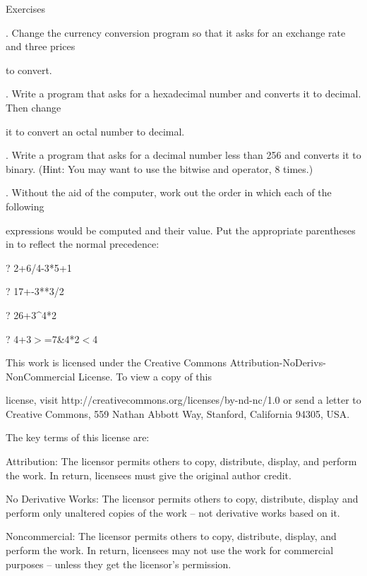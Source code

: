 \documentclass[a4paper,11pt]{book}
\begin{document}
\noindent 

\noindent Exercises

\noindent 

.   Change the currency conversion program so that it asks for an exchange rate and three prices

\noindent to convert.

\noindent 

.   Write a program that asks for a hexadecimal number and converts it to decimal. Then change

\noindent it to convert an octal number to decimal.

\noindent 

.   Write a program that asks for a decimal number less than 256 and converts it to binary. (Hint: You may want to use the bitwise and operator, 8 times.)

\noindent 

.   Without the aid of the computer, work out the order in which each of the following

\noindent expressions would be computed and their value. Put the appropriate parentheses in to reflect the normal precedence:

\noindent 

\noindent 

\noindent ? 2+6/4-3*5+1

\noindent ? 17+-3**3/2

\noindent ? 26+3\^{}4*2

\noindent ? 4+3$>$=7\textbar {}\&4*2$<$4

\noindent  

\noindent  

\noindent  

\noindent  

\noindent 

\noindent 

\noindent 

\noindent This work is licensed under the Creative Commons Attribution-NoDerivs-NonCommercial License. To view a copy of this

\noindent license, visit http://creativecommons.org/licenses/by-nd-nc/1.0 or send a letter to Creative Commons, 559 Nathan Abbott Way, Stanford, California 94305, USA.

\noindent 

\noindent The key terms of this license are:

\noindent 

\noindent Attribution: The licensor permits others to copy, distribute, display, and perform the work. In return, licensees must give the original author credit.

\noindent 

\noindent No  Derivative  Works: The licensor permits others to copy, distribute, display and perform only unaltered copies of the work -- not derivative works based on it.

\noindent 

\noindent Noncommercial: The licensor permits others to copy, distribute, display, and perform the work. In return, licensees may not use the work for commercial purposes -- unless they get the licensor's permission.
\end{document}

